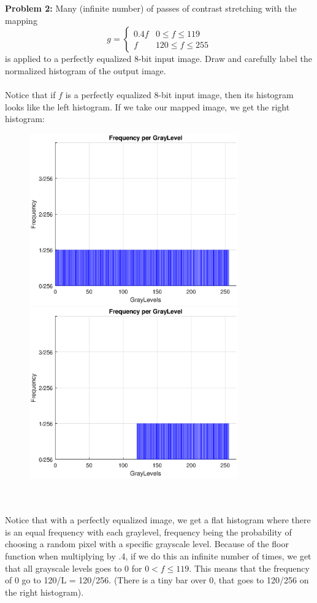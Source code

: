 \documentclass[11pt]{article}
\newenvironment{problem}[1]{\textbf{Problem #1: }}{\newpage}
\begin{document}
	\begin{problem}{2}
		Many (infinite number) of passes of contrast stretching with the mapping \\
		\[g = \begin{cases}
		0.4f & 0 \leq f \leq 119 \\
		f & 120 \leq f \leq 255
		\end{cases}\]
		is applied to a perfectly equalized 8-bit input image.  Draw and carefully label the normalized histogram 
		of the output image. 
		\\ \\
		Notice that if $f$ is a perfectly equalized 8-bit input image, then its histogram looks like the left histogram.  If we take our mapped image, we get the right histogram:
		\\ 
		\begin{figure}[h!]
			\includegraphics[width = 9cm]{Matlab/F2.eps}
			\includegraphics[width = 9cm]{Matlab/G2.eps}
		\end{figure}
		\\ \\
		Notice that with a perfectly equalized image, we get a flat histogram where there is an equal frequency with each graylevel, frequency being the probability of choosing a random pixel with a specific grayscale level.  Because of the floor function when multiplying by .4, if we do this an infinite number of times, we get that all grayscale levels goes to 0 for $0 < f \leq 119$.  This means that the frequency of 0  go to 120/L = 120/256. (There is a tiny bar over 0, that goes to 120/256 on the right histogram).
	\end{problem}
\end{document}
